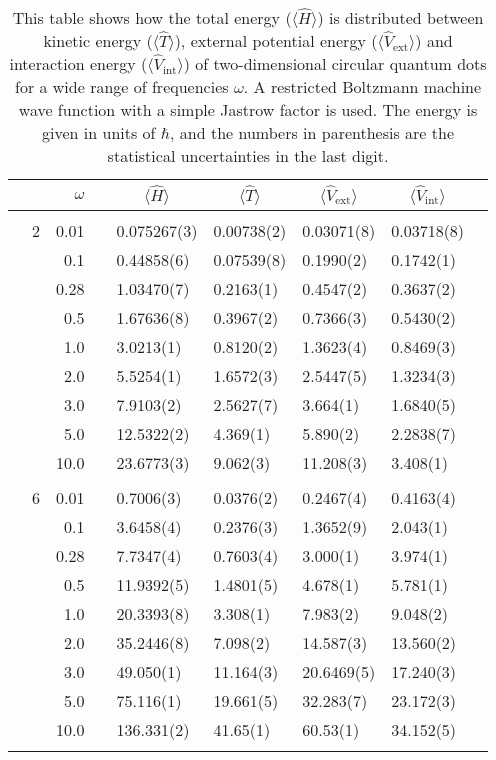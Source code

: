\begin{table}[H]
	\caption{This table shows how the total energy ($\langle\hat{H}\rangle$) is distributed between kinetic energy ($\langle\hat{T}\rangle$), external potential energy ($\langle\hat{V}_{\text{ext}}\rangle$) and interaction energy ($\langle\hat{V}_{\text{int}}\rangle$) of two-dimensional circular quantum dots for a wide range of frequencies $\omega$. A restricted Boltzmann machine wave function with a simple Jastrow factor is used. The energy is given in units of $\hbar$, and the numbers in parenthesis are the statistical uncertainties in the last digit.}
	\label{tab:splitfrequencyQDRBMSJ}
	\begin{tabularx}{\textwidth}{R{1cm}rrcR{2.3cm}R{2.3cm}R{2.3cm}R{2.3cm}R{1cm}} \hline\hline
		&\makecell{\\ \phantom{$N$} \\ \phantom{=}} & $\omega$ &&  &  &  &  & \\ \hline \\
		&2 & 0.01 && 0.075267(3) & 0.00738(2) & 0.03071(8) & 0.03718(8) \\
		&& 0.1 && 0.44858(6) & 0.07539(8) & 0.1990(2) & 0.1742(1) \\
		&& 0.28 && 1.03470(7) & 0.2163(1) & 0.4547(2) & 0.3637(2) \\
		&& 0.5 && 1.67636(8) & 0.3967(2) & 0.7366(3) & 0.5430(2)\\
		&& 1.0 && 3.0213(1) & 0.8120(2) & 1.3623(4) & 0.8469(3)\\
		&& 2.0 && 5.5254(1) & 1.6572(3) & 2.5447(5) & 1.3234(3) \\
		&& 3.0 && 7.9103(2) & 2.5627(7) & 3.664(1) & 1.6840(5) \\ 
		&& 5.0 && 12.5322(2) & 4.369(1) & 5.890(2) & 2.2838(7) \\
		&& 10.0 && 23.6773(3) & 9.062(3) & 11.208(3) & 3.408(1) \\
		\hdashline \\
		
		&6 & 0.01 && 0.7006(3) & 0.0376(2) & 0.2467(4) & 0.4163(4) \\
		&& 0.1 && 3.6458(4) & 0.2376(3) & 1.3652(9) & 2.043(1) \\
		&& 0.28 && 7.7347(4) & 0.7603(4) & 3.000(1) & 3.974(1) \\
		&& 0.5 && 11.9392(5) & 1.4801(5) & 4.678(1) & 5.781(1) \\
		&& 1.0 && 20.3393(8) & 3.308(1) & 7.983(2) & 9.048(2) \\
		&& 2.0 && 35.2446(8) & 7.098(2) & 14.587(3) & 13.560(2) \\
		&& 3.0 && 49.050(1) & 11.164(3) & 20.6469(5) & 17.240(3) \\ 
		&& 5.0 && 75.116(1) & 19.661(5) & 32.283(7) & 23.172(3) \\
		&& 10.0 && 136.331(2) & 41.65(1) & 60.53(1) & 34.152(5) \\
		\hdashline \\
		

\end{tabularx}
\end{table}
